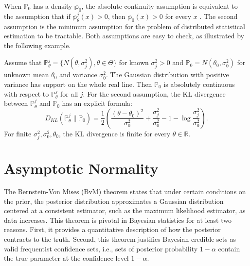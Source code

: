 \documentclass[twoside,11pt]{article}
\numberwithin{equation}{section}
\newcommand{\R}{{\mathbb{R}}}
\newcommand\bP{\mathbb{P}}
\newcommand\bp{\mathbb{p}}
\begin{document}
{When $\bP_0$ has a density $\bp_0$, the absolute continuity assumption is equivalent to the assumption that if $\bp_\theta^j(x) > 0$, then $\bp_0(x) > 0$  for every $x$ \citep{cover1999elements}. The second assumption is the minimum assumption for the problem of distributed statistical estimation to be tractable. Both assumptions are easy to check, as illustrated by the following example. 

\begin{example}
Assume that $\bP_\theta^j = \{N(\theta, \sigma^2_j), \theta \in \Theta\}$ for known $\sigma^2_j > 0$ and $\bP_0 = N(\theta_0, \sigma_0^2)$ for unknown mean $\theta_0$ and variance $\sigma_0^2$. The Gaussian distribution with positive variance has support on the whole real line. Then $\bP_0$ is absolutely continuous with respect to $\bP_\theta^j$ for all $j$.  For the second assumption, the KL divergence between $\bP_\theta^j$ and $\bP_0$ has an explicit formula: 
\begin{equation*}
    D_{KL}(\bP_\theta^j \parallel \bP_0) = \frac{1}{2} \left( \frac{(\theta - \theta_0)^2}{\sigma_0^2} + \frac{\sigma_j^2}{\sigma_0^2} - 1 - \log \frac{\sigma_j^2}{\sigma_0^2} \right).
\end{equation*}
For finite $\sigma_j^2, \sigma_0^2, \theta_0$, the KL divergence is finite for every $\theta \in \R$. 
\end{example}



\section{Asymptotic Normality} \label{sect: bvm}

The Bernstein-Von Mises (BvM) theorem states that under certain conditions on the prior, the posterior distribution approximates a Gaussian distribution centered at a consistent estimator, such as the maximum likelihood estimator, as data increases. This theorem is pivotal in Bayesian statistics for at least two reasons. First, it provides a quantitative description of how the posterior contracts to the truth. Second,  this theorem justifies Bayesian credible sets as valid frequentist confidence sets, i.e., sets of posterior probability $1 - \alpha$ contain the true parameter at the confidence level $1 - \alpha$. 

}
\end{document}
